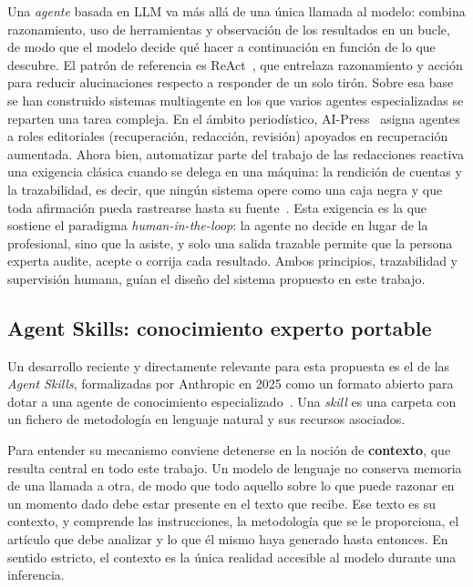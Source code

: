 Una \textit{agente} basada en LLM va más allá de una única llamada al modelo: combina
razonamiento, uso de herramientas y observación de los resultados en un bucle,
de modo que el modelo decide qué hacer a continuación en función de lo que
descubre. El patrón de referencia es ReAct~\cite{yao2023react}, que entrelaza
razonamiento y acción para reducir alucinaciones respecto a responder de un solo
tirón. Sobre esa base se han construido sistemas multiagente en los que varios
agentes especializadas se reparten una tarea compleja. En el ámbito periodístico,
AI-Press~\cite{liu2025aipress} asigna agentes a roles editoriales (recuperación,
redacción, revisión) apoyados en recuperación aumentada. Ahora bien,
automatizar parte del trabajo de las redacciones reactiva una exigencia clásica
cuando se delega en una máquina: la rendición de cuentas y la trazabilidad, es
decir, que ningún sistema opere como una caja negra y que toda afirmación pueda
rastrearse hasta su fuente~\cite{diakopoulos2019}. Esta exigencia es la que sostiene el
paradigma \textit{human-in-the-loop}: la agente no decide en lugar de la profesional,
sino que la asiste, y solo una salida trazable permite que la persona experta
audite, acepte o corrija cada resultado. Ambos principios, trazabilidad y
supervisión humana, guían el diseño del sistema propuesto en este trabajo.

\subsection{Agent Skills: conocimiento experto portable}

Un desarrollo reciente y directamente relevante para esta propuesta es el de las
\textit{Agent Skills}, formalizadas por Anthropic en 2025 como un formato abierto
para dotar a una agente de conocimiento especializado~\cite{anthropic2025skills}.
Una \textit{skill} es una carpeta con un fichero de metodología en lenguaje natural
y sus recursos asociados.

Para entender su mecanismo conviene detenerse en la noción de \textbf{contexto},
que resulta central en todo este trabajo. Un modelo de lenguaje no conserva
memoria de una llamada a otra, de modo que todo aquello sobre lo que puede razonar
en un momento dado debe estar presente en el texto que recibe. Ese texto es su
contexto, y comprende las instrucciones, la metodología que se le proporciona, el
artículo que debe analizar y lo que él mismo haya generado hasta entonces. En
sentido estricto, el contexto es la única realidad accesible al modelo durante una
inferencia.

